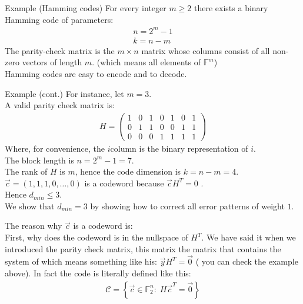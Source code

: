     \begin{parag}{Example (Hamming codes)}
        For every integer $m \geq 2$ there exists a binary Hamming code of parameters:
        \begin{align*} 
            n =  2^m - 1\\
            k =  n-m
        \end{align*}
        The parity-check matrix is the $m \times n$ matrix whose columns consist of all non-zero vectors of length $m$. (which means all elements of $\mathbb{F}^m$)\\
        Hamming codes are easy to encode and to decode.
        \begin{subparag}{Example (cont.)}
            For instance, let $m =  3$.\\
            A valid parity check matrix is:
            \begin{align*} H =  \begin{pmatrix} 1 & 0 & 1 & 0 & 1 & 0 & 1 \\ 0 & 1 & 1 & 0 & 0 & 1 & 1 \\ 0 & 0 & 0 & 1 & 1 & 1 & 1 \end{pmatrix}  \end{align*}
            Where, for convenience, the $i$\Th column is the binary representation of $i$.\\
            The block length is $n =  2^m - 1 = 7$.\\
            The rank of $H$ is $m$, hence the code dimension is $k =  n-m =  4$.\\
            $\vec{c} = \left(1, 1, 1, 0, \ldots, 0\right)$ is a codeword because $\vec{c}H^T =  0$ .\\
            Hence $d_{min} \leq 3$.\\
            We show that $d_{min} =  3$ by showing how to correct all error patterns of weight $1$.\\
            \begin{framedremark}
                The reason why $\vec{c}$ is a codeword is:\\
                First, why does the codeword is in the nullspace of $H^T$. We have said it when we introduced the parity check matrix, this matrix  the matrix that contains the system of  which means something like his: $\vec{y}H^T =  \vec{0}$ ( you can check the example above). In fact the code is literally defined like this:
                \begin{align*} \mathcal{C} =  \left\{\vec{c} \in \mathbb{F}_2^n : \; H \vec{c}^T =  \vec{0}\right\} \end{align*}

\end{framedremark}
\end{subparag}
\end{parag}
